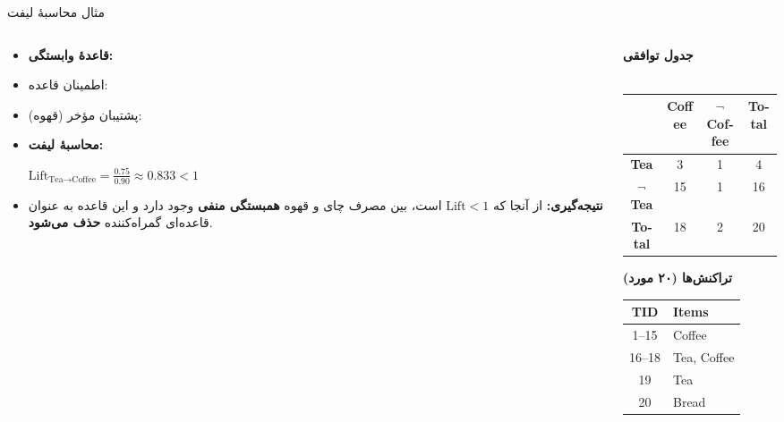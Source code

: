 \begin{frame}{مثال محاسبهٔ لیفت}{}
\begin{columns}[T,onlytextwidth]
\begin{column}{0.53\textwidth}
\begin{itemize}\setlength{\itemsep}{3pt}\small
    \item \textbf{قاعدهٔ وابستگی:} 
    \item اطمینان قاعده: 
    \item پشتیبان مؤخر (قهوه): 
    \vspace{0.15cm}
    \item \textbf{محاسبهٔ لیفت:}
    \begin{center}
    \begin{latin}
    $\mathrm{Lift}_{\text{Tea} \to \text{Coffee}} = \frac{0.75}{0.90} \approx 0.833 < 1$
    \end{latin}
    \end{center}
    \item \alert{\textbf{نتیجه‌گیری:}} از آنجا که $\mathrm{Lift} < 1$ است، بین مصرف چای و قهوه \textbf{همبستگی منفی} وجود دارد و این قاعده به عنوان قاعده‌ای گمراه‌کننده \textbf{حذف می‌شود}.
\end{itemize}
\end{column}%
\begin{column}{0.45\textwidth}
\centering
\textbf{\small جدول توافقی}\\[1pt]
{\scriptsize{}}\\[3pt]
\begin{latin}
\fontsize{7.5}{9.5}\selectfont
\begin{tabular}{|c|c|c|c|}
\hline
\rowcolor{mannheimblue!15}
 & \textbf{Coffee} & \textbf{$\neg$Coffee} & \textbf{Total} \\ \hline
\textbf{Tea} & 3 & 1 & 4 \\ \hline
\textbf{$\neg$Tea} & 15 & 1 & 16 \\ \hline
\textbf{Total} & 18 & 2 & 20 \\ \hline
\end{tabular}
\end{latin}

\vspace{0.1cm}
\textbf{\small تراکنش‌ها (۲۰ مورد)}\\[3pt]
\begin{latin}
\fontsize{7}{8.5}\selectfont
\begin{tabular}{|c|l|}
\hline
\rowcolor{mannheimblue!15}
\textbf{TID} & \textbf{Items} \\ \hline
1--15 & Coffee \\ \hline
16--18 & Tea, Coffee \\ \hline
19 & Tea \\ \hline
20 & Bread \\ \hline
\end{tabular}
\end{latin}
\end{column}
\end{columns}
\end{frame}

